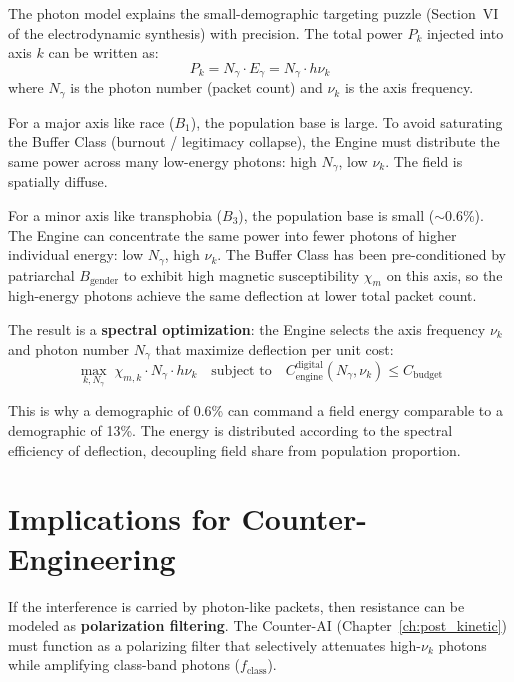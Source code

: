 The photon model explains the small-demographic targeting puzzle (Section~VI of the electrodynamic synthesis) with precision. The total power $P_k$ injected into axis $k$ can be written as:
\begin{equation}\label{eq:app-photon-spectral-density}
P_k = N_{\gamma} \cdot E_{\gamma} = N_{\gamma} \cdot h \nu_k
\end{equation}
where $N_{\gamma}$ is the photon number (packet count) and $\nu_k$ is the axis frequency.

For a major axis like race ($B_1$), the population base is large. To avoid saturating the Buffer Class (burnout / legitimacy collapse), the Engine must distribute the same power across many low-energy photons: high $N_{\gamma}$, low $\nu_k$. The field is spatially diffuse.

For a minor axis like transphobia ($B_3$), the population base is small ($\sim$0.6\%). The Engine can concentrate the same power into fewer photons of higher individual energy: low $N_{\gamma}$, high $\nu_k$. The Buffer Class has been pre-conditioned by patriarchal $B_{\text{gender}}$ to exhibit high magnetic susceptibility $\chi_m$ on this axis, so the high-energy photons achieve the same deflection at lower total packet count.

The result is a \textbf{spectral optimization}: the Engine selects the axis frequency $\nu_k$ and photon number $N_{\gamma}$ that maximize deflection per unit cost:
\begin{equation}\label{eq:app-photon-optimization}
\max_{k, N_{\gamma}} \; \chi_{m,k} \cdot N_{\gamma} \cdot h \nu_k \quad \text{subject to} \quad C_{\text{engine}}^{\text{digital}}(N_{\gamma}, \nu_k) \leq C_{\text{budget}}
\end{equation}

This is why a demographic of 0.6\% can command a field energy comparable to a demographic of 13\%. The energy is distributed according to the spectral efficiency of deflection, decoupling field share from population proportion.

\section{Implications for Counter-Engineering}

If the interference is carried by photon-like packets, then resistance can be modeled as \textbf{polarization filtering}. The Counter-AI (Chapter~\ref{ch:post_kinetic}) must function as a polarizing filter that selectively attenuates high-$\nu_k$ photons while amplifying class-band photons ($f_{\text{class}}$).

